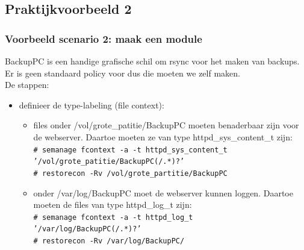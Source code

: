 \subsection{Praktijkvoorbeeld 2}
\begin{styleframe}
    \frametitle{Voorbeeld scenario 2: maak een module}
BackupPC is een handige grafische schil om rsync voor het maken van backups. \\
Er is geen standaard policy voor dus die moeten we zelf maken. \\
\pause
De stappen:
\footnotesize
\begin{itemize}
	\item definieer de type-labeling (file context):
	\footnotesize
	\begin{itemize}
		\footnotesize
		\item files onder /vol/grote\_patitie/BackupPC moeten benaderbaar zijn voor de webserver. Daartoe moeten ze van type
httpd\_sys\_content\_t zijn: \\
		\footnotesize
		{\tt \# semanage fcontext -a -t httpd\_sys\_content\_t  \\
		\hspace{7pt} '/vol/grote\_patitie/BackupPC(/.*)?' \\
		\# restorecon -Rv /vol/grote\_partitie/BackupPC} \\
		\footnotesize
		\pause
		\item onder /var/log/BackupPC moet de webserver kunnen loggen. Daartoe moeten de files van type httpd\_log\_t zijn: \\
		\footnotesize
	{\tt \# semanage fcontext -a -t httpd\_log\_t \\
	\hspace{7pt} '/var/log/BackupPC(/.*)?' \\
	\# restorecon -Rv /var/log/BackupPC/}
	\end{itemize}
\end{itemize}
\end{styleframe}

